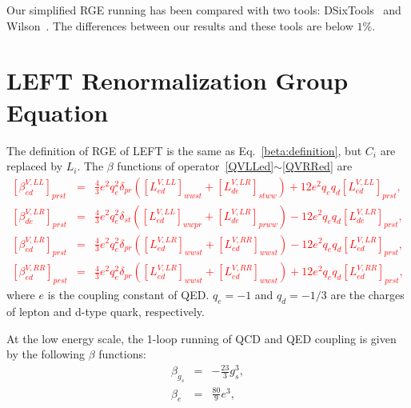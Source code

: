 \documentclass[a4paper,11pt]{article}
\begin{document}
Our simplified RGE running has been compared with two tools: DSixTools~\cite{Celis:2017hod,Fuentes-Martin:2020zaz} and Wilson~\cite{Aebischer:2018bkb}.
The differences between our results and these tools are below $1\%$.


\section{LEFT Renormalization Group Equation}\label{leftrge}

The definition of RGE of LEFT is the same as Eq.~\ref{beta:definition}, but $C_i$ are replaced by $L_i$.
The $\beta$ functions of operator~\ref{QVLLed}$\sim$\ref{QVRRed} are
\textcolor{red}{
\begin{eqnarray}
  \left[\beta^{V,LL}_{ed}\right]_{prst} &=& \frac{4}{3}e^2q^2_e\delta_{pr}\left([L^{V,LL}_{ed}]_{wwst}+[L^{V,LR}_{de}]_{stww}\right)+12e^2q_eq_d[L^{V,LL}_{ed}]_{prst},  \label{beta:VLLed} \\
  \left[\beta^{V,LR}_{de}\right]_{prst} &=& \frac{4}{3}e^2q^2_e\delta_{st}\left([L^{V,LL}_{ed}]_{wwpr}+[L^{V,LR}_{de}]_{prww}\right)-12e^2q_eq_d[L^{V,LR}_{de}]_{prst}, \label{beta:VLRde} \\
  \left[\beta^{V,LR}_{ed}\right]_{prst} &=& \frac{4}{3}e^2q^2_e\delta_{pr}\left([L^{V,LR}_{ed}]_{wwst}+[L^{V,RR}_{ed}]_{wwst}\right)-12e^2q_eq_d[L^{V,LR}_{ed}]_{prst}, \label{beta:VLRed} \\
  \left[\beta^{V,RR}_{ed}\right]_{prst} &=& \frac{4}{3}e^2q^2_e\delta_{pr}\left([L^{V,LR}_{ed}]_{wwst}+[L^{V,RR}_{ed}]_{wwst}\right)+12e^2q_eq_d[L^{V,RR}_{ed}]_{prst}, \label{beta:VRRed} 
\end{eqnarray}
}
where $e$ is the coupling constant of QED. 
$q_e=-1$ and $q_d=-1/3$ are the charges of lepton and d-type quark, respectively. 

At the low energy scale, the 1-loop running of QCD and QED coupling is given by the following $\beta$ functions:
\begin{eqnarray}
  \beta_{g_s} &=& -\frac{23}{3}g^3_s,  \\
  \beta_{e} &=& \frac{80}{9}e^3, 
\end{eqnarray}







		
		

		
\end{document}
